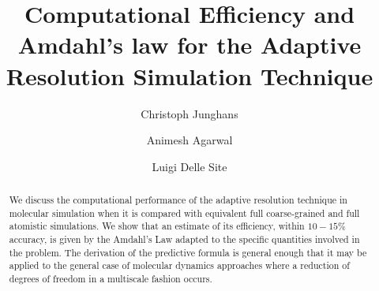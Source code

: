 \documentclass[a4paper,preprint,unsortedaddress]{revtex4-1}
\begin{document}
\title{Computational Efficiency and Amdahl's law for the Adaptive Resolution Simulation Technique}
\author{Christoph Junghans}
\author{Animesh Agarwal}
\author{Luigi Delle Site}
\begin{abstract}
We discuss the computational performance of the adaptive resolution technique in molecular simulation when it is compared with equivalent full coarse-grained and full atomistic simulations. We show that an estimate of its efficiency, within $10-15\%$ accuracy, is given by the Amdahl's Law adapted to the specific quantities involved in the problem. The derivation of the predictive formula is general enough that it may be applied to the general case of molecular dynamics approaches where a reduction of degrees of freedom in a multiscale fashion occurs.

\end{abstract}

\maketitle
\end{document}
